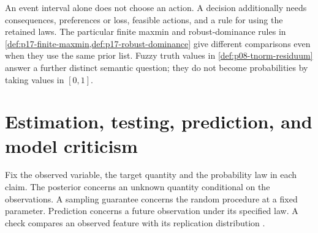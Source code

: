 An event interval alone does not choose an action. A decision additionally
needs consequences, preferences or loss, feasible actions, and a rule for
using the retained laws. The particular finite maxmin and robust-dominance
rules in \cref{def:p17-finite-maxmin,def:p17-robust-dominance} give different
comparisons even when they use the same prior list. Fuzzy truth values in
\cref{def:p08-tnorm-residuum} answer a further distinct semantic
question; they do not become probabilities by taking values in \([0,1]\).

\section{Estimation, testing, prediction, and model criticism}
\label{sec:p14-evidence-statistical}

Fix the observed variable, the target quantity and the probability law in
each claim. The posterior concerns an unknown quantity conditional on the
observations. A sampling guarantee concerns the random procedure at a fixed
parameter. Prediction concerns a future observation under its specified law.
A check compares an observed feature with its replication distribution
\cite{Neyman1937Confidence,KassRaftery1995BayesFactors,GelmanMengStern1996Main}.

